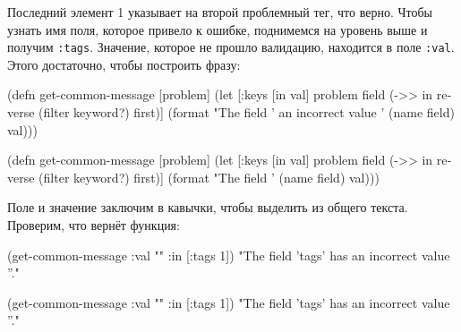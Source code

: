 \fi

Последний элемент 1 указывает на второй проблемный тег, что верно. Чтобы узнать
имя поля, которое привело к ошибке, поднимемся на уровень выше и получим
\verb|:tags|. Значение, которое не прошло валидацию, находится в поле
\verb|:val|. Этого достаточно, чтобы построить фразу:

\ifx\devicetype\mobile

\begin{english}
  \begin{clojure}
(defn get-common-message
  [problem]
  (let [{:keys [in val]} problem
        field (->> in
                   reverse
                   (filter keyword?)
                   first)]
    (format
      "The field '%
                an incorrect value '%
      (name field) val)))
  \end{clojure}
\end{english}

\else

\begin{english}
  \begin{clojure}
(defn get-common-message
  [problem]
  (let [{:keys [in val]} problem
        field (->> in
                   reverse
                   (filter keyword?)
                   first)]
    (format "The field '%
            (name field) val)))
  \end{clojure}
\end{english}

\fi

Поле и значение заключим в кавычки, чтобы выделить из общего текста. Проверим,
что вернёт функция:

\ifx\devicetype\mobile

\begin{english}
  \begin{clojure}
(get-common-message
  {:val "" :in [:tags 1]})
"The field 'tags' has
          an incorrect value ''."
  \end{clojure}
\end{english}

\else

\begin{english}
  \begin{clojure}
(get-common-message {:val "" :in [:tags 1]})
"The field 'tags' has an incorrect value ''."
  \end{clojure}
\end{english}

\fi

